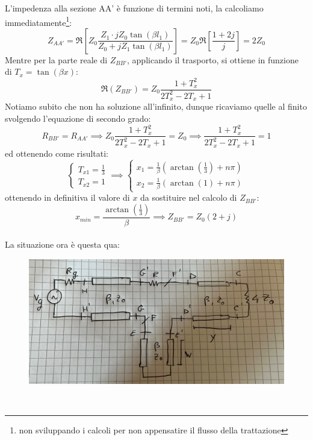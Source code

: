 \documentclass{book}
\begin{document}
         L'impedenza alla sezione AA' è funzione di termini noti, la calcoliamo immediatamente\footnote{non sviluppando i calcoli per non appensatire il flusso della trattazione}:
         \begin{equation}
            Z_{AA'} = \Re[Z_{0} \frac{Z_{1}\cdot j Z_{0}\tan(\beta l_{1})}{Z_{0}+jZ_{1}\tan(\beta l_{1})}] = Z_{0}\Re[ \frac{1+2j}{j}] = 2Z_{0}
         \end{equation}
         Mentre per la parte reale di $Z_{BB'}$, applicando il trasporto, si ottiene in funzione di $T_{x}=\tan(\beta x)$:
         \begin{equation}
            \Re(Z_{BB'})=Z_{0}\frac{1+T_{x} ^{2}}{2T_{x} ^{2}-2T_{x}+1}
         \end{equation}
         Notiamo subito che non ha soluzione all'infinito, dunque ricaviamo quelle al finito svolgendo l'equazione di secondo grado:
         \begin{equation}
          R_{BB'}=R_{AA'} \implies  Z_{0} \frac{1+T_{x} ^{2}}{2T_{x} ^{2}-2T_{x}+1} = Z_{0} \implies \frac{1+T_{x} ^{2}}{2T_{x} ^{2}-2T_{x}+1} = 1
         \end{equation}
         ed ottenendo come risultati:
         \begin{equation}
            \begin{cases}
                T_{x1}=\frac{1}{3} \\ T_{x2} =1    
            \end{cases} \implies
            \begin{cases}
                x_{1} = \frac{1}{\beta} (\arctan (\frac{1}{3})+n\pi) \\
                x_{2}=\frac{1}{\beta} (\arctan (1)+n\pi) 
            \end{cases}
         \end{equation}
         ottenendo in definitiva il valore di $x$ da sostituire nel calcolo di $Z_{BB'}$:
         \begin{equation}
            x_{min} = \frac{\arctan(\frac{1}{3})}{\beta} \implies Z_{BB'}=Z_{0}(2+j)
         \end{equation}
        \\ La situazione ora è questa qua:
        \begin{figure}[h!]
            \center  
            \includegraphics[width=0.85\linewidth]{img/Esercizi/Esercizi1.png}
        \end{figure} \\
\end{document}

